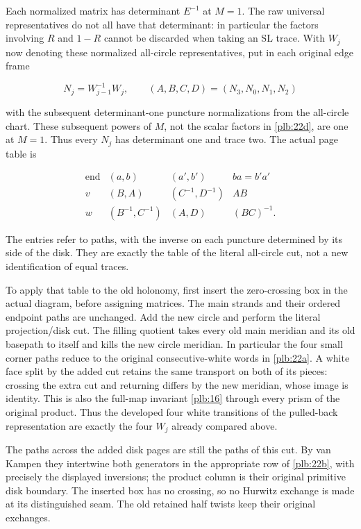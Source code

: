 Each normalized matrix has determinant \(E^{-1}\) at \(M=1\).
The raw universal representatives do not all have that determinant:
in particular the factors involving \(R\) and \(1-R\) cannot be
discarded when taking an SL trace. With \(W_j\) now denoting these
normalized all-circle representatives, put in each original edge frame

\begin{equation}\label{plb:22a}
N_j=W_{j-1}^{-1}W_j,\qquad
 (A,B,C,D)=(N_3,N_0,N_1,N_2)
\end{equation}

with the subsequent determinant-one puncture normalizations from the
all-circle chart. These subsequent powers of \(M\), not the scalar
factors in \eqref{plb:22d}, are one at \(M=1\). Thus every \(N_j\) has determinant
one and trace two. The actual page table is

\begin{equation}\label{plb:22b}
\begin{array}{c|c|c|c}
\text{end}&(a,b)&(a',b')&ba=b'a'\\ \hline
v&(B,A)&(C^{-1},D^{-1})&AB\\
w&(B^{-1},C^{-1})&(A,D)&(BC)^{-1}.
\end{array}
\end{equation}

The entries refer to paths, with the inverse on each puncture determined by its side of the disk. They are exactly the table of the literal all-circle cut, not a new identification of equal traces.

To apply that table to the old holonomy, first insert the zero-crossing box in the actual diagram, before assigning matrices. The main strands and their ordered endpoint paths are unchanged. Add the new circle and perform the literal projection/disk cut. The filling quotient takes every old main meridian and its old basepath to itself and kills the new circle meridian. In particular the four small corner paths reduce to the original consecutive-white words in \eqref{plb:22a}. A white face split by the added cut retains the same transport on both of its pieces: crossing the extra cut and returning differs by the new meridian, whose image is identity. This is also the full-map invariant \eqref{plb:16} through every prism of the original product. Thus the developed four white transitions of the pulled-back representation are exactly the four \(W_j\) already compared above.

The paths across the added disk pages are still the paths of this cut. By van Kampen they intertwine both generators in the appropriate row of \eqref{plb:22b}, with precisely the displayed inversions; the product column is their original primitive disk boundary. The inserted box has no crossing, so no Hurwitz exchange is made at its distinguished seam. The old retained half twists keep their original exchanges.

